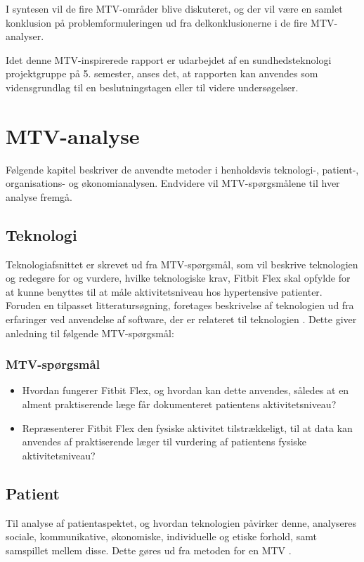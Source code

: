 I syntesen vil de fire MTV-områder blive diskuteret, og der vil være en samlet konklusion på problemformuleringen ud fra delkonklusionerne i de fire MTV-analyser. 


Idet denne MTV-inspirerede rapport er udarbejdet af en sundhedsteknologi projektgruppe på 5. semester, anses det, at rapporten kan anvendes som vidensgrundlag til en beslutningstagen eller til videre undersøgelser. 


\chapter{MTV-analyse}
Følgende kapitel beskriver de anvendte metoder i henholdsvis teknologi-, patient-, organisations- og økonomianalysen. Endvidere vil MTV-spørgsmålene til hver analyse fremgå. 

\section{Teknologi}\label{sec:metode_tek}
Teknologiafsnittet er skrevet ud fra MTV-spørgsmål, som vil beskrive teknologien og redegøre for og vurdere, hvilke teknologiske krav, Fitbit Flex skal opfylde for at kunne benyttes til at måle aktivitetsniveau hos hypertensive patienter. 
Foruden en tilpasset litteratursøgning, foretages beskrivelse af teknologien ud fra erfaringer ved anvendelse af software, der er relateret til teknologien \citep{mtvhaandbog}. Dette giver anledning til følgende MTV-spørgsmål: 
\subsection{MTV-spørgsmål}
\begin{itemize}
\item Hvordan fungerer Fitbit Flex, og hvordan kan dette anvendes, således at en alment praktiserende læge får dokumenteret patientens aktivitetsniveau?
\item Repræsenterer Fitbit Flex den fysiske aktivitet tilstrækkeligt, til at data kan anvendes af praktiserende læger til vurdering af patientens fysiske aktivitetsniveau?
\end{itemize}

\section{Patient}\label{sec:metode_pat}
Til analyse af patientaspektet, og hvordan teknologien påvirker denne, analyseres sociale, kommunikative, økonomiske, individuelle og etiske forhold, samt samspillet mellem disse. Dette gøres ud fra metoden for en MTV \citep{mtvhaandbog}.

